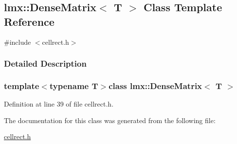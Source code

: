 \hypertarget{classlmx_1_1_dense_matrix}{}\subsection{lmx\+:\+:Dense\+Matrix$<$ T $>$ Class Template Reference}
\label{classlmx_1_1_dense_matrix}


{\ttfamily \#include $<$cellrect.\+h$>$}



\subsubsection{Detailed Description}
\subsubsection*{template$<$typename T$>$class lmx\+::\+Dense\+Matrix$<$ T $>$}



Definition at line 39 of file cellrect.\+h.



The documentation for this class was generated from the following file\+:\begin{DoxyCompactItemize}
\item 
\hyperlink{cellrect_8h}{cellrect.\+h}\end{DoxyCompactItemize}
